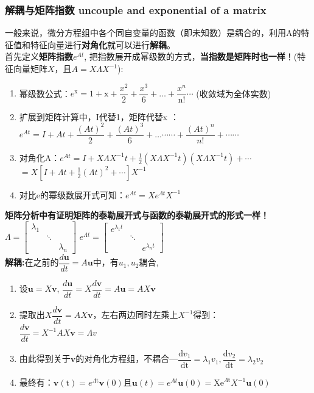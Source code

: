     \subsubsection{解耦与矩阵指数 uncouple and exponential of a matrix}
    一般来说，微分方程组中各个同自变量的函数（即未知数）是耦合的，利用A的特征值和特征向量进行\textbf{对角化}就可以进行\textbf{解耦}。
    \\
    首先定义\textbf{矩阵指数$e^{A t}$}, 把指数展开成幂级数的方式，\textbf{当指数是矩阵时也一样}！(特征向量矩阵$X$，且$A=X\Lambda X^{-1}$):
    \begin{enumerate}
        \item 幂级数公式：$e^{\mathrm{x}}=1+\mathrm{x}+\dfrac{x^{2}}{2}+\dfrac{x^{3}}{6}+ \dots +\dfrac{x^{n}}{\mathrm{n} !}\cdots$ \quad (收敛域为全体实数)
        \item 扩展到矩阵计算中，I代替1，矩阵代替x ：\\
        $e^{A t}=I+A t+\dfrac{(A t)^{2}}{2}+\dfrac{(A t)^{3}}{6}+\dots \cdots \cdots+\dfrac{(A t)^{n}}{n !}+\cdots \cdots$
        \item 对角化A：$e^{A t}=I+X \Lambda X^{-1} t+\frac{1}{2}\left(X \Lambda X^{-1} t\right)\left(X \Lambda X^{-1} t\right)+\cdots$\\
        $=X\left[I+\Lambda t+\frac{1}{2}(\Lambda t)^{2}+\cdots\right] X^{-1}$
        \item 对比e的幂级数展开式可知：$e^{A t}=X e^{\Lambda t} X^{-1}$
    \end{enumerate}
    \textbf{矩阵分析中有证明矩阵的泰勒展开式与函数的泰勒展开式的形式一样！}\\
    $\Lambda=\left[\begin{array}{ccc}{\lambda_{1}} & {} & {} \\ {} & {\ddots} & {} \\ {} & {} & {\lambda_{n}}\end{array}\right]$ \quad
    $e^{\Lambda t} = \left[\begin{array}{ccc}{e^{\lambda_{1} t}} & {} & {} \\ {} & {\ddots} & {} \\ {} & {} & {e^{\lambda_{n} t}}\end{array}\right]$
    \\
    \textbf{解耦:}在之前的$\dfrac{d\bm{u}}{dt}=A\bm{u}$中，有$u_1, u_2$耦合,
    \begin{enumerate}
        \item 设$\bm{u}=X\bm{v}$, $\dfrac{{d} \bm{u}}{dt}={X} \dfrac{{d} \bm{v}}{{dt}}=A\bm{u}=AX\bm{v}$
        \item 提取出${X} \dfrac{{d} \bm{v}}{{dt}}=AX\bm{v}$，左右两边同时左乘上$X^{-1}$得到：\\
        $\dfrac{{d} \bm{v}}{{dt}}=X^{-1}AX\bm{v} = \Lambda v$
        \item 由此得到关于$\bm{v}$的对角化方程组，不耦合---$\dfrac{\mathrm{d} v_{1}}{\mathrm{dt}}=\lambda_{1} v_{1}, \dfrac{\mathrm{d} v_{2}}{\mathrm{dt}}=\lambda_{2} v_{2}$
        \item 最终有：$\bm{v}(\mathrm{t})=e^{\Lambda \mathrm{t}} \bm{v}(0)$且$\bm{u}(t)=e^{A t} \bm{u}(0)=\mathrm{Xe}^{\Lambda \mathrm{t}} X^{-1} \bm{u}(0)$
    \end{enumerate}
